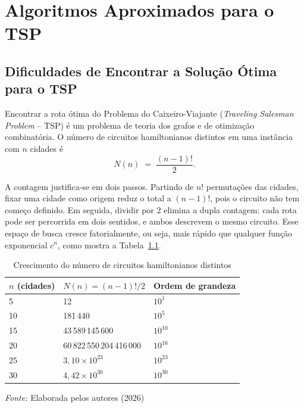 
\chapter{Algoritmos Aproximados para o TSP}

\section{Dificuldades de Encontrar a Solução Ótima para o TSP}
\label{sec:dificuldades-tsp}

Encontrar a rota ótima do Problema do Caixeiro-Viajante
(\textit{Traveling Salesman Problem} -- TSP) é um problema de teoria dos
grafos e de otimização combinatória. O número de circuitos hamiltonianos
distintos em uma instância com $n$ cidades é
\begin{equation}
	N(n) \;=\; \frac{(n-1)!}{2}.
	\label{eq:espaco-busca}
\end{equation}

A contagem justifica-se em dois passos. Partindo de $n!$ permutações das
cidades, fixar uma cidade como origem reduz o total a $(n-1)!$, pois o
circuito não tem começo definido. Em seguida, dividir por $2$ elimina a
dupla contagem: cada rota pode ser percorrida em dois sentidos, e ambos
descrevem o mesmo circuito. Esse espaço de busca cresce fatorialmente, ou
seja, mais rápido que qualquer função exponencial $c^{n}$, como mostra a
Tabela~\ref{tab:crescimento-fatorial}.

\begin{table}[!ht]
	\centering
	\caption{Crescimento do número de circuitos hamiltonianos distintos}
	\label{tab:crescimento-fatorial}
	\begin{tabular}{p{2.6cm}p{4.4cm}p{3.4cm}}
	\hline
	\textbf{$n$ (cidades)} & \textbf{$N(n) = (n-1)!/2$} & \textbf{Ordem de grandeza} \\
	\hline
	5  & 12                          & $10^{1}$  \\
	10 & 181\,440                    & $10^{5}$  \\
	15 & 43\,589\,145\,600           & $10^{10}$ \\
	20 & 60\,822\,550\,204\,416\,000 & $10^{16}$ \\
	25 & $3{,}10 \times 10^{23}$     & $10^{23}$ \\
	30 & $4{,}42 \times 10^{30}$     & $10^{30}$ \\
	\hline
\end{tabular}

\vspace{0.15cm}
\parbox{10.4cm}{\footnotesize\textit{Fonte:} Elaborada pelos autores (2026)}
\end{table}

